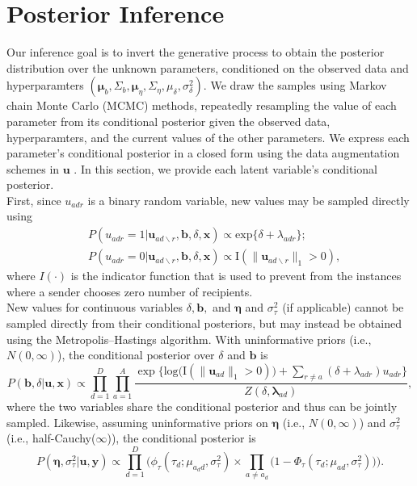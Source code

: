\documentclass[12pt]{article}
\begin{document}
\section{Posterior Inference}\label{sec:inference}
Our inference goal is to invert the generative process to obtain the posterior distribution over the unknown parameters, conditioned on the observed data and hyperparamters $(\boldsymbol{\mu}_b, \Sigma_b, \boldsymbol{\mu}_\eta, \Sigma_\eta, {\mu}_\delta,\sigma^2_\delta)$. We draw the samples using Markov chain Monte Carlo (MCMC) methods, repeatedly resampling the value of each parameter from its conditional posterior given the observed data, hyperparamters, and the current values of the other parameters. We express each parameter’s conditional posterior in a closed form using the data augmentation schemes in $\boldsymbol{u}$ \cite{tanner1987calculation}. In this section, we provide each latent variable's conditional posterior. \\ \newline
First, since $u_{adr}$ is a binary random variable, new values may be sampled directly using
\begin{equation}
\begin{aligned}
&P(u_{adr}=1| \boldsymbol{u}_{ad\backslash r}, \boldsymbol{b}, \delta, \boldsymbol{x})
\propto \mbox{exp}\{\delta+\lambda_{adr}\};\\
&P(u_{adr}=0| \boldsymbol{u}_{ad\backslash r},\boldsymbol{b}, \delta, \boldsymbol{x})\propto \text{I}(\lVert\boldsymbol{u}_{ad\backslash r}\rVert_1 > 0 ),
\end{aligned}
\label{eqn:latentreceiver}
\end{equation}
where $I(\cdot)$ is the indicator function that is used to prevent from the instances where a sender chooses zero number of recipients.\\ \newline
New values for continuous variables $\delta, \boldsymbol{b},$ and $\boldsymbol{\eta}$ and $\sigma^2_\tau$ (if applicable) cannot be sampled directly from their conditional posteriors, but may instead be obtained using the Metropolis--Hastings algorithm. With uninformative priors (i.e., $N({0},\infty)$), the conditional posterior over $\delta$ and $\boldsymbol{b}$ is
\begin{equation}
P(\boldsymbol{b}, \delta| \boldsymbol{u}, \boldsymbol{x})\propto \prod_{d=1}^D
\prod_{a=1}^A \frac{\exp\Big\{\mbox{log}\big(\text{I}( \lVert \boldsymbol{u}_{ad}\rVert_1 > 0)\big) + \sum\limits_{r \neq a} (\delta+\lambda_{adr})u_{adr}\Big\}}{Z(\delta,\boldsymbol{\lambda}_{ad})},
\end{equation}
where the two variables share the conditional posterior and thus can be jointly sampled. Likewise, assuming uninformative priors on $\boldsymbol{\eta}$ (i.e., $N({0},\infty)$) and $\sigma_{\tau}^2$ (i.e., half-Cauchy($\infty$)), the conditional posterior is
\begin{equation}
P(\boldsymbol{\eta}, \sigma_\tau^2| \boldsymbol{u}, \boldsymbol{y})\propto \prod_{d=1}^D\Big(\phi_{\tau}(\tau_{d}; \mu_{a_d d}, \sigma_\tau^2)\times \prod_{a\neq a_d}\big(1-\Phi_{\tau}(\tau_{d}; \mu_{a d}, \sigma_\tau^2) \big)\Big).
\end{equation}
\end{document}
